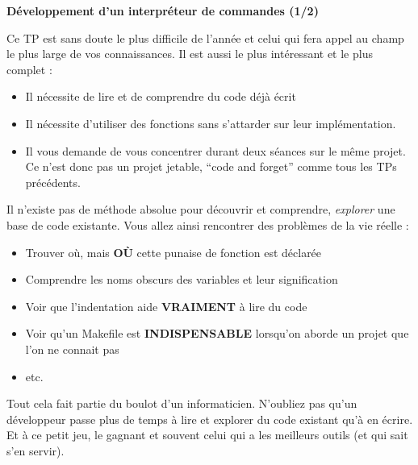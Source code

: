 \documentclass[10pt]{article}
\begin{document}
\vspace*{0.5cm}

\begin{center}
  {\large {\bf Développement d'un interpréteur de commandes (1/2)}}
\end{center}

\vspace*{0.5cm}

Ce TP est sans doute le plus difficile de l'année et celui qui fera
appel au champ le plus large de vos connaissances. Il est aussi le plus
intéressant et le plus complet :

\begin{itemize}
\item Il nécessite de lire et de comprendre du code déjà écrit
\item Il nécessite d'utiliser des fonctions sans s'attarder sur leur
  implémentation.
\item Il vous demande de vous concentrer durant deux séances sur le
  même projet. Ce n'est donc pas un projet jetable, ``code and
  forget'' comme tous les TPs précédents.
\end{itemize}

Il n'existe pas de méthode absolue pour découvrir et comprendre,
\textit{explorer} une base de code existante. Vous allez ainsi
rencontrer des problèmes de la vie réelle :

\begin{itemize}
\item Trouver où, mais \textbf{OÙ} cette punaise de fonction est déclarée
\item Comprendre les noms obscurs des variables et leur signification
\item Voir que l'indentation aide \textbf{VRAIMENT} à lire du code
\item Voir qu'un Makefile est \textbf{INDISPENSABLE} lorsqu'on aborde un projet
  que l'on ne connait pas
\item etc.
\end{itemize}

Tout cela fait partie du boulot d'un informaticien. N'oubliez pas qu'un
développeur passe plus de temps à lire et explorer du code existant
qu'à en écrire. Et à ce petit jeu, le gagnant et souvent celui qui a
les meilleurs outils (et qui sait s'en servir).
\end{document}
